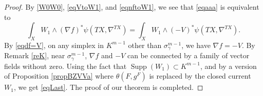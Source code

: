 \documentclass[11pt]{article}
\numberwithin{equation}{section}
\theoremstyle{plain}
\theoremstyle{definition}
\theoremstyle{remark}
\DeclareMathOperator{\Supp}{Supp}
\begin{document}
\begin{proof}
By \eqref{W0W0}, \eqref{eqVtoW1}, and \eqref{eqnftoW1}, we see that \eqref{eqaaa} is equivalent to
\begin{equation}\label{eqLast}
\int_{X}W_{1} \wedge (\nabla
f)^{*}\psi(TX,\nabla^{TX})=\int_{X}W_{1}\wedge
(-V)^{*}\psi(TX,\nabla^{TX}).
\end{equation}
By \eqref{eqdf=V}, on any simplex in
$K^{m-1}$ other than $\sigma_{\gamma}^{m-1}$, we have $\nabla f=-V$.
By Remark \ref{reK}, near $\sigma_{\gamma}^{m-1}$, $\nabla
f$ and $-V$ can be connected by a family of vector fields without
zero. Using the fact that $\Supp(W_{1})\subset K^{m-1}$,
and by a version of Proposition \ref{propBZVVa} where
$\theta(F,g^{F})$ is replaced by the closed current $W_{1}$, we get \eqref{eqLast}.
The proof of our theorem is completed.
\end{proof}


\end{document}
